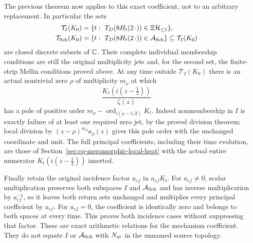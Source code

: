 The previous theorem now applies to this exact coefficient,
not to an arbitrary replacement. In particular the sets
\begin{equation}\label{eq:cq-xi4-arithmetic-return-times}
 \begin{aligned}
 \mathcal T_I(K_0)
    &=\{t:\ T_D(8H_t(2\,\cdot))\in\Xi\mathcal H_{\leq 1}\},\\
 \mathcal T_{\rm Sch}(K_0)
    &=\{t:\ T_D(8H_t(2\,\cdot))\in\mathcal A_{\rm Sch}\}
       \subseteq\mathcal T_I(K_0)
 \end{aligned}
\end{equation}
are closed discrete subsets of $\mathbb C$.
Their complete individual membership conditions are still the
original multiplicity jets and, for the second set, the
finite-strip Mellin conditions proved above.
At any time outside $\mathcal T_I(K_0)$ there is an actual
nontrivial zero $\rho$ of multiplicity $m_\rho$ at which
\[
 \frac{K_t(i(z-\tfrac12))}{\zeta(z)}
\]
has a pole of positive order
$m_\rho-\operatorname{ord}_{i(\rho-1/2)}K_t$.
Indeed nonmembership in $I$ is exactly failure of at least
one required zero jet, by the proved division theorem; local
division by $(z-\rho)^{m_\rho}a_\rho(z)$ gives this pole order
with the unchanged coordinate and unit.
The full principal coefficients, including their time evolution,
are those of Section~\ref{sec:cq-meromorphic-local-heat}
with the actual entire numerator
$K_t(i(z-\tfrac12))$ inserted.

Finally retain the original incidence factor $a_{ef}$ in
$a_{ef}K_t$. For $a_{ef}\ne0$, scalar multiplication preserves
both subspaces $I$ and $\mathcal A_{\rm Sch}$ and has inverse
multiplication by $a_{ef}^{-1}$, so it leaves both return sets
unchanged and multiplies every principal coefficient by $a_{ef}$.
For $a_{ef}=0$, the coefficient is identically zero and belongs
to both spaces at every time. This proves both incidence cases
without suppressing that factor.
These are exact arithmetic relations for the mechanism coefficient.
They do not equate $I$ or $\mathcal A_{\rm Sch}$ with $N_{\rm ar}$
in the unnamed source topology.

